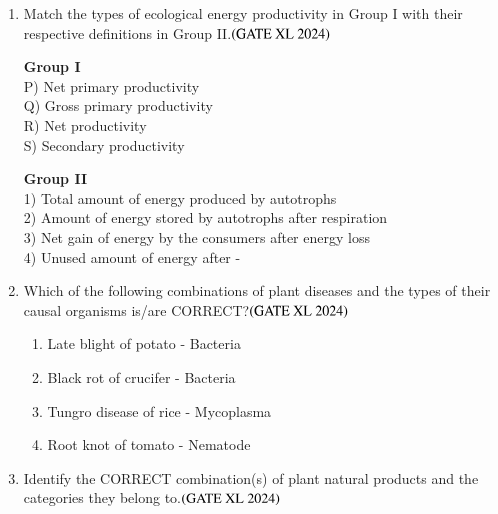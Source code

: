 \documentclass[journal]{IEEEtran}
\begin{document}
\begin{enumerate}
    \item Match the types of ecological energy productivity in Group I with their respective definitions in Group II.\hfill $\left(\text{GATE XL 2024}\right)$
    \begin{multicols}{2}
    \noindent \textbf{Group I} \\
    P) Net primary productivity \\
    Q) Gross primary productivity \\
    R) Net productivity \\
    S) Secondary productivity \\

    \columnbreak

    \noindent \textbf{Group II} \\
    1) Total amount of energy produced by autotrophs \\
    2) Amount of energy stored by autotrophs after respiration \\
    3) Net gain of energy by the consumers after energy loss \\
    4) Unused amount of energy after - \\
    \end{multicols}

    \item Which of the following combinations of plant diseases and the types of their causal organisms is/are CORRECT?\hfill $\left(\text{GATE XL 2024}\right)$
    \begin{enumerate}
        \item Late blight of potato - Bacteria
        \item Black rot of crucifer - Bacteria
        \item Tungro disease of rice - Mycoplasma
        \item Root knot of tomato - Nematode
    \end{enumerate}

    \item Identify the CORRECT combination(s) of plant natural products and the categories they belong to.\hfill $\left(\text{GATE XL 2024}\right)$
    \begin{enumerate}
    \end{enumerate}


\end{enumerate}
\end{document}

